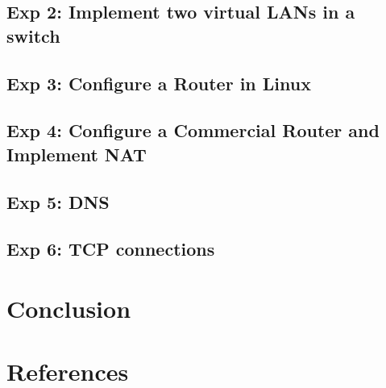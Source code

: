 \documentclass[compilation.tex]{subfiles}
\begin{document}
\subsection{Exp 2: Implement two virtual LANs in a switch}
\label{exp:2}

\subsection{Exp 3: Configure a Router in Linux}
\label{exp:3}

\subsection{Exp 4: Configure a Commercial Router and Implement NAT}
\label{exp:4}

\subsection{Exp 5: DNS}
\label{exp:5}

\subsection{Exp 6: TCP connections}
\label{exp:6}

\section{Conclusion}
\label{sec:conclusion}

\section{References}
\label{sec:references}
\end{document}
